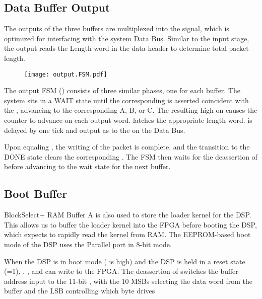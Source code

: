     \subsection{Data Buffer Output}
      
       The outputs of the three buffers are multiplexed into the
       signal, which is optimized for interfacing
      with the system Data Bus. Similar to the input stage, the output
      reads the Length word in the data header to determine total
      packet length.

      \begin{figure}
        \texttt{[image: output.FSM.pdf]}
      \end{figure}
       The output FSM () consists of three similar
      phases, one for each buffer. The system sits in a WAIT state
      until the corresponding  is asserted
      coincident with the , advancing to the
      corresponding A, B, or C. The resulting high on
       causes the  counter to
      advance on each output word.  latches the
      appropriate length word.  is delayed by one
      tick and output as  to the  on
      the Data Bus.

      Upon  equaling , the
      writing of the packet is complete, and the transition to the
      DONE state clears the corresponding . The
      FSM then waits for the deassertion of  before
      advancing to the wait state for the next buffer.
   
\subsection{Boot Buffer}

BlockSelect+ RAM Buffer A is also used to store the loader kernel for
the DSP. This allows us to buffer the loader kernel into the FPGA
before booting the DSP, which expects to rapidly read the kernel from
RAM. The EEPROM-based boot mode of the DSP uses the Parallel port in
8-bit mode.

When the DSP is in boot mode ( is high) and the DSP is
held in a reset state (=1), ,
, and  can write to the FPGA. The
deassertion of  switches the buffer address input to
the 11-bit , with the 10 MSBs selecting the data word
from the buffer and the LSB controlling which byte drives

